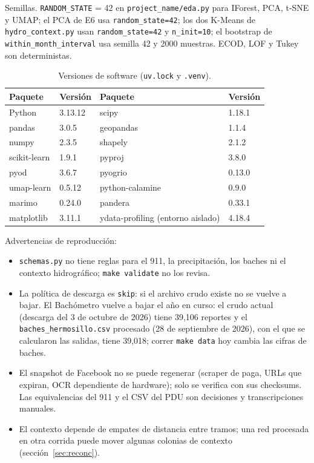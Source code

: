 \documentclass[11pt]{article}
\newcommand{\cod}[1]{\nolinkurl{#1}}
\begin{document}
Semillas. \cod{RANDOM_STATE} = 42 en \cod{project_name/eda.py} para IForest, PCA, t-SNE y UMAP; el PCA de E6 usa \cod{random_state=42}; los dos K-Means de \cod{hydro_context.py} usan \cod{random_state=42} y \cod{n_init=10}; el bootstrap de \cod{within_month_interval} usa semilla 42 y 2000 muestras. ECOD, LOF y Tukey son deterministas.

\begin{table}[!htbp]
  \centering
  \small
  \caption{Versiones de software (\cod{uv.lock} y \cod{.venv}).}
  \label{tab:versiones}
  \begin{tabular}{llll}
    \toprule
    Paquete & Versión & Paquete & Versión \\
    \midrule
    Python & 3.13.12 & scipy & 1.18.1 \\
    pandas & 3.0.5 & geopandas & 1.1.4 \\
    numpy & 2.3.5 & shapely & 2.1.2 \\
    scikit-learn & 1.9.1 & pyproj & 3.8.0 \\
    pyod & 3.6.7 & pyogrio & 0.13.0 \\
    umap-learn & 0.5.12 & python-calamine & 0.9.0 \\
    marimo & 0.24.0 & pandera & 0.33.1 \\
    matplotlib & 3.11.1 & ydata-profiling (entorno aislado) & 4.18.4 \\
    \bottomrule
  \end{tabular}
\end{table}

Advertencias de reproducción:

\begin{itemize}
  \item \cod{schemas.py} no tiene reglas para el 911, la precipitación, los baches ni el contexto hidrográfico; \texttt{make validate} no los revisa.
  \item La política de descarga es \cod{skip}: si el archivo crudo existe no se vuelve a bajar. El Bachómetro vuelve a bajar el año en curso: el crudo actual (descarga del 3 de octubre de 2026) tiene 39,106 reportes y el \cod{baches_hermosillo.csv} procesado (28 de septiembre de 2026), con el que se calcularon las salidas, tiene 39,018; correr \texttt{make data} hoy cambia las cifras de baches.
  \item El snapshot de Facebook no se puede regenerar (scraper de paga, URLs que expiran, OCR dependiente de hardware); solo se verifica con sus checksums. Las equivalencias del 911 y el CSV del PDU son decisiones y transcripciones manuales.
  \item El contexto depende de empates de distancia entre tramos; una red procesada en otra corrida puede mover algunas colonias de contexto (sección~\ref{sec:reconc}).
\end{itemize}
\end{document}
